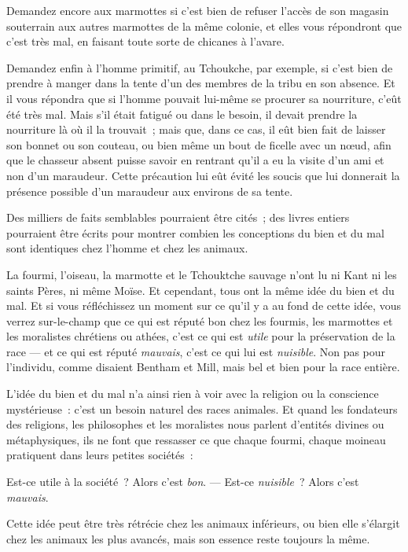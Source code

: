\documentclass[french,twoside]{book} %
\begin{document}
Demandez encore aux marmottes si c’est bien de refuser l’accès de son magasin souterrain aux autres marmottes de la même colonie, et elles vous répondront que c’est très mal, en faisant toute sorte de chicanes à l’avare.\par
Demandez enfin à l’homme primitif, au Tchoukche, par exemple, si c’est bien de prendre à manger dans la tente d’un des membres de la tribu en son absence. Et il vous répondra que si l’homme pouvait lui-même se procurer sa nourriture, c’eût été très mal. Mais s’il était fatigué ou dans le besoin, il devait prendre la nourriture là où il la trouvait ; mais que, dans ce cas, il eût bien fait de laisser son bonnet ou son couteau, ou bien même un bout de ficelle avec un nœud, afin que le chasseur absent puisse savoir en rentrant qu’il a eu la visite d’un ami et non d’un maraudeur. Cette précaution lui eût évité les soucis que lui donnerait la présence possible d’un maraudeur aux environs de sa tente.\par
Des milliers de faits semblables pourraient être cités ; des livres entiers pourraient être écrits pour montrer combien les conceptions du bien et du mal sont identiques chez l’homme et chez les animaux.\par
\bigbreak
\noindent La fourmi, l’oiseau, la marmotte et le Tchouktche sauvage n’ont lu ni Kant ni les saints Pères, ni même Moïse. Et cependant, tous ont la même idée du bien et du mal. Et si vous réfléchissez un moment sur ce qu’il y a au fond de cette idée, vous verrez sur-le-champ que ce qui est réputé bon chez les fourmis, les marmottes et les moralistes chrétiens ou athées, c’est ce qui est \emph{utile} pour la préservation de la race — et ce qui est réputé \emph{mauvais}, c’est ce qui lui est \emph{nuisible}. Non pas pour l’individu, comme disaient Bentham et Mill, mais bel et bien pour la race entière.\par
L’idée du bien et du mal n’a ainsi rien à voir avec la religion ou  la conscience mystérieuse : c’est un besoin naturel des races animales. Et quand les fondateurs des religions, les philosophes et les moralistes nous parlent d’entités divines ou métaphysiques, ils ne font que ressasser ce que chaque fourmi, chaque moineau pratiquent dans leurs petites sociétés :\par
Est-ce utile à la société ? Alors c’est \emph{bon}. — Est-ce \emph{nuisible} ? Alors c’est \emph{mauvais}.\par
\bigbreak
\noindent Cette idée peut être très rétrécie chez les animaux inférieurs, ou bien elle s’élargit chez les animaux les plus avancés, mais son essence reste toujours la même.\par
\end{document}
